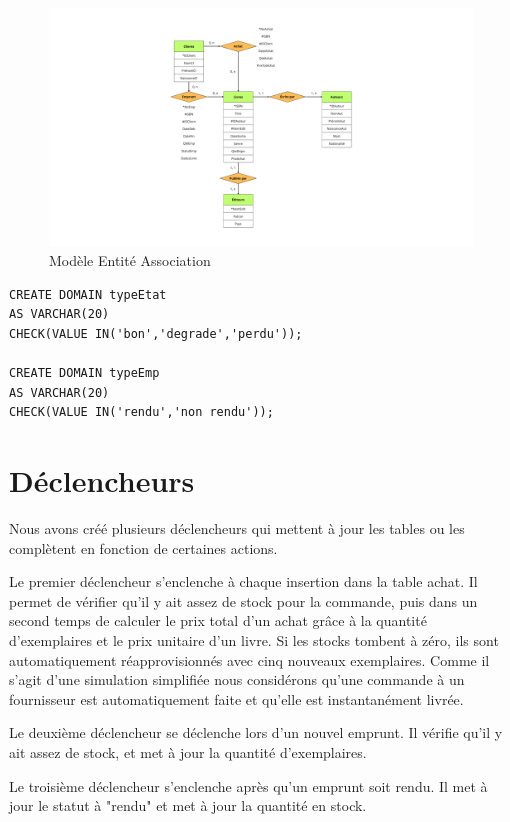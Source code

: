 \documentclass[10pt,a4paper,parskip=full*,DIV=11]{scrartcl}
\begin{document}
\begin{figure}
    \centering
    \includegraphics[trim=6cm 0cm 5cm 0cm, clip, width=1.2\textwidth]{MEA_BD}
    \caption{Modèle Entité Association}\label{fig.mea}
\end{figure}

\begin{lstlisting}
CREATE DOMAIN typeEtat
AS VARCHAR(20) 
CHECK(VALUE IN('bon','degrade','perdu'));

CREATE DOMAIN typeEmp
AS VARCHAR(20) 
CHECK(VALUE IN('rendu','non rendu'));
\end{lstlisting}

\newpage
\section{Déclencheurs}
Nous avons créé plusieurs déclencheurs qui mettent à jour les tables ou les complètent en fonction de certaines actions.

	Le premier déclencheur s’enclenche à chaque insertion dans la table achat. Il permet de vérifier qu’il y ait assez de stock pour la commande, puis dans un second temps de calculer le 
    prix total d’un achat grâce à la quantité d’exemplaires et le prix unitaire d’un livre. Si les stocks tombent à zéro, ils sont automatiquement réapprovisionnés avec cinq nouveaux 
    exemplaires. Comme il s’agit d’une simulation simplifiée nous considérons qu’une commande à un fournisseur est automatiquement faite et qu’elle est instantanément livrée.

Le deuxième déclencheur se déclenche lors d’un nouvel emprunt. Il vérifie qu’il y ait assez de stock, et met à jour la quantité d’exemplaires.

Le troisième déclencheur s’enclenche après qu’un emprunt soit rendu. Il met à jour le statut à "rendu" et met à jour la quantité en stock.
\end{document}
